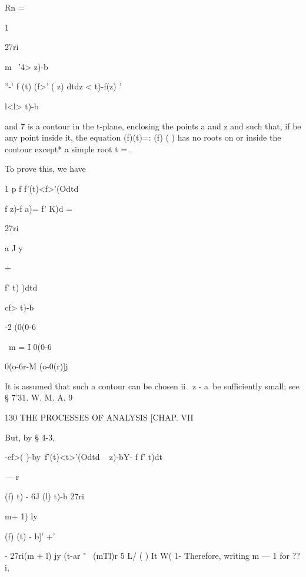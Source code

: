 Rn = 



1 

27ri 



m \ 
'4> z)-b 



''-' f (t) (f>' ( z) dtdz 
<  t)-f(z) ' 



l<l> t)-b\  

and 7 is a contour in the t-plane, enclosing the points a and z and such that, if 
  be any point inside it, the equation (f)(t)=: (f) ( ) has no roots on or inside the 
contour except* a simple root t =  . 

To prove this, we have 

1 p f f'(t)<f>'(Odtd  



f z)-f a)= f' K)d  = 



27ri 



a J y 



+ 



f' t)   )dtd  

cf> t)-b 



-2 (0(0-6 



\ m = I 0(0-6 



 0(o-6r-M (o-0(r)]j 



It is assumed that such a contour can be chosen ii \ z - a\ be sufficiently small; see § 7'31. 
W. M. A. 9 



130 THE PROCESSES OF ANALYSIS [CHAP. VII 

But, by § 4-3, 

-cf>( )-by\ f'(t)<t>'(Odtd \  < > z)-bY-  f f' t)dt 



— r 



(f)  t) - 6J (l) t)-b 27ri 



 m+ 1) ly 



 (f) (t) - b]' +' 



- 27ri(m + l) jy (t-ar  " ~(mTl)r 5   L/ ( ) It W( 1- 
Therefore, writing m — 1 for ??i, 

